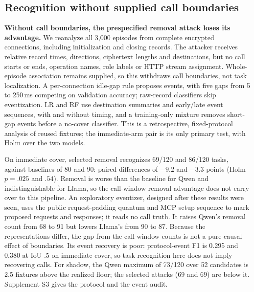 \subsection{Recognition without supplied call boundaries}\label{sec:no-call}
\textbf{Without call boundaries, the prespecified removal attack loses its advantage.}
We reanalyze all 3,000 episodes from complete encrypted connections, including initialization and closing records. The attacker receives relative record times, directions, ciphertext lengths and destinations, but no call starts or ends, operation names, role labels or HTTP stream assignment. Whole-episode association remains supplied, so this withdraws call boundaries, not task localization. A per-connection idle-gap rule proposes events, with five gaps from 5 to 250\,ms competing on validation accuracy; raw-record classifiers skip eventization. LR and RF use destination summaries and early/late event sequences, with and without timing, and a training-only mixture removes short-gap events before a no-cover classifier. This is a retrospective, fixed-protocol analysis of reused fixtures; the immediate-arm pair is its only primary test, with Holm over the two models.


On immediate cover, selected removal recognizes 69/120 and 86/120 tasks, against baselines of 80 and 90: paired differences of $-9.2$ and $-3.3$ points (Holm $p=.025$ and $.54$). Removal is worse than the baseline for Qwen and indistinguishable for Llama, so the call-window removal advantage does not carry over to this pipeline. An exploratory eventizer, designed after these results were seen, uses the public request-padding quantum and MCP setup sequence to mark proposed requests and responses; it reads no call truth. It raises Qwen's removal count from 68 to 91 but lowers Llama's from 90 to 87. Because the representations differ, the gap from the call-window counts is not a pure causal effect of boundaries. Its event recovery is poor: protocol-event F1 is 0.295 and 0.380 at IoU .5 on immediate cover, so task recognition here does not imply recovering calls. For shadow, the Qwen maximum of 73/120 over 52 candidates is 2.5 fixtures above the realized floor; the selected attacks (69 and 69) are below it. Supplement S3 gives the protocol and the event audit.
